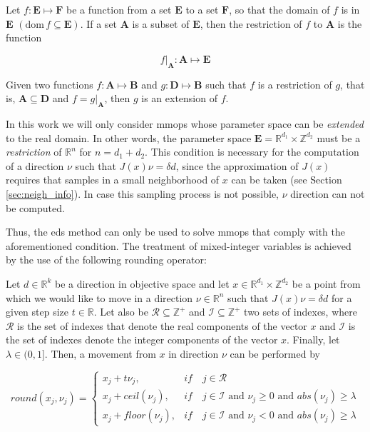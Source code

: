 \begin{mydef}
Let $f: \mathbf{E} \mapsto \mathbf{F}$ be a function from a set $\mathbf{E}$ to a set $\mathbf{F}$, so that the domain of $f$ is in $\mathbf{E}$ $(\mathrm{dom} \, f \subseteq \mathbf{E})$. If a set $\mathbf{A}$ is a subset of $\mathbf{E}$, then the restriction of $f$ to $\mathbf{A}$ is the function

\[f|_\mathbf{A}: \mathbf{A} \mapsto \mathbf{E}\]

Given two functions $f: \mathbf{A} \mapsto \mathbf{B}$ and $g: \mathbf{D} \mapsto \mathbf{B}$ such that $f$ is a restriction of $g$, that is, $\mathbf{A} \subseteq \mathbf{D}$ and $f = g |_\mathbf{A}$, then $g$ is an extension of $f$.
\label{def:domain_restriction}
\end{mydef} 

In this work we will only consider \glspl{mmop} whose parameter space can be \emph{extended} to the real domain. In other words, the parameter space $\mathbf{E} = \mathbb{R}^{d_1} \times \mathbb{Z}^{d_2} $ must be a \emph{restriction} of $\mathbb{R}^n$ for $n = d_1+d_2$. This condition is necessary for the computation of a direction $\nu$ such that $J(x) \nu = \delta d$, since the approximation of $J(x)$ requires that samples in a small neighborhood of $x$ can be taken (see Section \ref{sec:neigh_info}). In case this sampling process is not possible, $\nu$ direction can not be computed.

Thus, the \gls{eds} method can only be used to solve \glspl{mmop} that comply with the aforementioned condition. The treatment of mixed-integer variables is achieved by the use of the following rounding operator: 

\begin{mydef}

Let $d \in \mathbb{R}^k$ be a direction in objective space and let $x \in \mathbb{R}^{d_1} \times \mathbb{Z}^{d_2}$ be a point from which we would like to move in a direction $\nu \in \mathbb{R}^n$ such that $J(x) \nu = \delta d$ for a given step size $t \in \mathbb{R}$. Let also be $\mathcal{R} \subseteq \mathbb{Z}^+$ and $\mathcal{I} \subseteq \mathbb{Z}^+$ two sets of indexes, where $\mathcal{R}$ is the set of indexes that denote the real components of the vector $x$ and $\mathcal{I}$ is the set of indexes denote the integer components of the vector $x$. Finally, let $\lambda \in (0,1]$. Then, a movement from $x$ in direction $\nu$ can be performed by

\[
	round(x_j, \nu_j) = 
	\begin{cases}
	x_j + t \nu_j, & if \quad j \in \mathcal{R}\\ 
	x_j + ceil(\nu_j), & if \quad j \in \mathcal{I} \text{ and } \nu_j \geq 0 \text{ and } abs(\nu_j) \geq \lambda\\
	x_j + floor(\nu_j), & if \quad j \in \mathcal{I} \text{ and } \nu_j < 0 \text{ and } abs(\nu_j) \geq \lambda
	\end{cases}
\]

\end{mydef}

